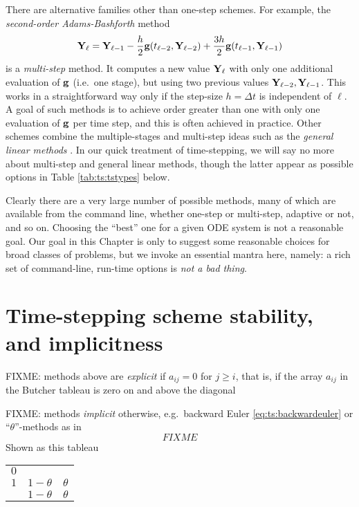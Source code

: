 There are alternative families other than one-step schemes.  For example, the \emph{second-order Adams-Bashforth} method
\begin{equation}
\mathbf{Y}_\ell = \mathbf{Y}_{\ell-1} - \frac{h}{2} \mathbf{g}(t_{\ell-2},\mathbf{Y}_{\ell-2}) + \frac{3 h}{2} \mathbf{g}(t_{\ell-1},\mathbf{Y}_{\ell-1})  \label{eq:ts:ab2}
\end{equation}
is a \emph{multi-step} method.  It computes a new value $\mathbf{Y}_\ell$ with only one additional evaluation of $\mathbf{g}$ (i.e.~one stage), but using two previous values $\mathbf{Y}_{\ell-2},\mathbf{Y}_{\ell-1}$.  This works in a straightforward way only if the step-size $h=\Delta t$ is independent of $\ell$.  A goal of such methods is to achieve order greater than one with only one evaluation of $\mathbf{g}$ per time step, and this is often achieved in practice.  Other schemes combine the multiple-stages and multi-step ideas such as the \emph{general linear methods} \citep{Butcher1987}.  In our quick treatment of time-stepping, we will say no more about multi-step and general linear methods, though the latter appear as possible \PETSc options in Table \ref{tab:ts:tstypes} below.

Clearly there are a very large number of possible methods, many of which are available from the \PETSc command line, whether one-step or multi-step, adaptive or not, and so on.   Choosing the ``best'' one for a given ODE system is not a reasonable goal.  Our goal in this Chapter is only to suggest some reasonable choices for broad classes of problems, but we invoke an essential \PETSc mantra here, namely: a rich set of command-line, run-time options is \emph{not a bad thing}.

\section{Time-stepping scheme stability, and implicitness}

FIXME: methods above are \emph{explicit} if $a_{ij}=0$ for $j\ge i$, that is, if the array $a_{ij}$ in the Butcher tableau is zero on and above the diagonal

FIXME: methods \emph{implicit} otherwise, e.g.~backward Euler \eqref{eq:ts:backwardeuler} or  ``$\theta$''-methods as in 
\begin{equation}
FIXME
\end{equation}
Shown as this tableau
\begin{center}
\begin{tabular}{c|cc}
$0$   \\
$1$ & $1-\theta$ & $\theta$ \\ \hline
    & $1-\theta$ & $\theta$
\end{tabular}
\end{center}

